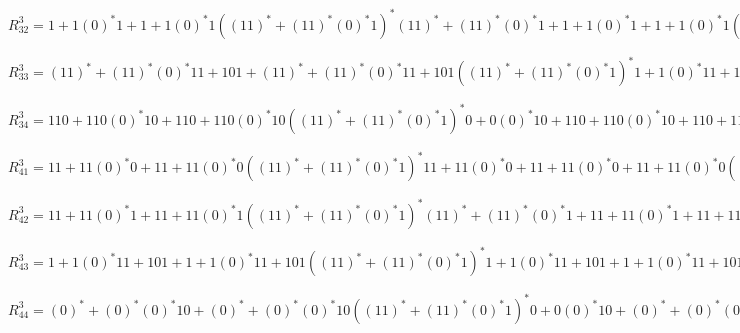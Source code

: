 \documentclass[11pt,a4paper]{report}
\begin{document}
$R_{32}^{3} = 1+1(0)^{*}1+1+1(0)^{*}1((11)^{*}+(11)^{*}(0)^{*}1)^{*}(11)^{*}+(11)^{*}(0)^{*}1+1+1(0)^{*}1+1+1(0)^{*}1((11)^{*}+(11)^{*}(0)^{*}1)^{*}(11)^{*}+(11)^{*}(0)^{*}1((11)^{*}+(11)^{*}(0)^{*}11+101+(11)^{*}+(11)^{*}(0)^{*}11+101((11)^{*}+(11)^{*}(0)^{*}1)^{*}1+1(0)^{*}11+101)^{*}1+1(0)^{*}1+1+1(0)^{*}1((11)^{*}+(11)^{*}(0)^{*}1)^{*}(11)^{*}+(11)^{*}(0)^{*}1$\\
$R_{33}^{3} = (11)^{*}+(11)^{*}(0)^{*}11+101+(11)^{*}+(11)^{*}(0)^{*}11+101((11)^{*}+(11)^{*}(0)^{*}1)^{*}1+1(0)^{*}11+101+(11)^{*}+(11)^{*}(0)^{*}11+101+(11)^{*}+(11)^{*}(0)^{*}11+101((11)^{*}+(11)^{*}(0)^{*}1)^{*}1+1(0)^{*}11+101((11)^{*}+(11)^{*}(0)^{*}11+101+(11)^{*}+(11)^{*}(0)^{*}11+101((11)^{*}+(11)^{*}(0)^{*}1)^{*}1+1(0)^{*}11+101)^{*}(11)^{*}+(11)^{*}(0)^{*}11+101+(11)^{*}+(11)^{*}(0)^{*}11+101((11)^{*}+(11)^{*}(0)^{*}1)^{*}1+1(0)^{*}11+101$\\
$R_{34}^{3} = 110+110(0)^{*}10+110+110(0)^{*}10((11)^{*}+(11)^{*}(0)^{*}1)^{*}0+0(0)^{*}10+110+110(0)^{*}10+110+110(0)^{*}10((11)^{*}+(11)^{*}(0)^{*}1)^{*}0+0(0)^{*}10((11)^{*}+(11)^{*}(0)^{*}11+101+(11)^{*}+(11)^{*}(0)^{*}11+101((11)^{*}+(11)^{*}(0)^{*}1)^{*}1+1(0)^{*}11+101)^{*}110+110(0)^{*}10+110+110(0)^{*}10((11)^{*}+(11)^{*}(0)^{*}1)^{*}0+0(0)^{*}10$\\
$R_{41}^{3} = 11+11(0)^{*}0+11+11(0)^{*}0((11)^{*}+(11)^{*}(0)^{*}1)^{*}11+11(0)^{*}0+11+11(0)^{*}0+11+11(0)^{*}0((11)^{*}+(11)^{*}(0)^{*}1)^{*}11+11(0)^{*}0((11)^{*}+(11)^{*}(0)^{*}11+101+(11)^{*}+(11)^{*}(0)^{*}11+101((11)^{*}+(11)^{*}(0)^{*}1)^{*}1+1(0)^{*}11+101)^{*}1+1(0)^{*}0+1+1(0)^{*}0((11)^{*}+(11)^{*}(0)^{*}1)^{*}11+11(0)^{*}0$\\
$R_{42}^{3} = 11+11(0)^{*}1+11+11(0)^{*}1((11)^{*}+(11)^{*}(0)^{*}1)^{*}(11)^{*}+(11)^{*}(0)^{*}1+11+11(0)^{*}1+11+11(0)^{*}1((11)^{*}+(11)^{*}(0)^{*}1)^{*}(11)^{*}+(11)^{*}(0)^{*}1((11)^{*}+(11)^{*}(0)^{*}11+101+(11)^{*}+(11)^{*}(0)^{*}11+101((11)^{*}+(11)^{*}(0)^{*}1)^{*}1+1(0)^{*}11+101)^{*}1+1(0)^{*}1+1+1(0)^{*}1((11)^{*}+(11)^{*}(0)^{*}1)^{*}(11)^{*}+(11)^{*}(0)^{*}1$\\
$R_{43}^{3} = 1+1(0)^{*}11+101+1+1(0)^{*}11+101((11)^{*}+(11)^{*}(0)^{*}1)^{*}1+1(0)^{*}11+101+1+1(0)^{*}11+101+1+1(0)^{*}11+101((11)^{*}+(11)^{*}(0)^{*}1)^{*}1+1(0)^{*}11+101((11)^{*}+(11)^{*}(0)^{*}11+101+(11)^{*}+(11)^{*}(0)^{*}11+101((11)^{*}+(11)^{*}(0)^{*}1)^{*}1+1(0)^{*}11+101)^{*}(11)^{*}+(11)^{*}(0)^{*}11+101+(11)^{*}+(11)^{*}(0)^{*}11+101((11)^{*}+(11)^{*}(0)^{*}1)^{*}1+1(0)^{*}11+101$\\
$R_{44}^{3} = (0)^{*}+(0)^{*}(0)^{*}10+(0)^{*}+(0)^{*}(0)^{*}10((11)^{*}+(11)^{*}(0)^{*}1)^{*}0+0(0)^{*}10+(0)^{*}+(0)^{*}(0)^{*}10+(0)^{*}+(0)^{*}(0)^{*}10((11)^{*}+(11)^{*}(0)^{*}1)^{*}0+0(0)^{*}10((11)^{*}+(11)^{*}(0)^{*}11+101+(11)^{*}+(11)^{*}(0)^{*}11+101((11)^{*}+(11)^{*}(0)^{*}1)^{*}1+1(0)^{*}11+101)^{*}110+110(0)^{*}10+110+110(0)^{*}10((11)^{*}+(11)^{*}(0)^{*}1)^{*}0+0(0)^{*}10$\\
\end{document}
